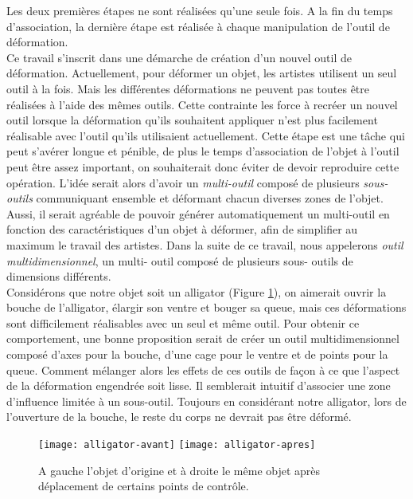 Les deux premières étapes ne sont réalisées qu'une seule fois. A la fin du
temps d'association, la dernière étape est réalisée à chaque manipulation de
l'outil de déformation. \\

Ce travail s'inscrit dans une démarche de création d'un nouvel outil de
déformation. Actuellement, pour déformer un objet, les artistes utilisent un
seul outil à la fois. Mais les différentes déformations ne peuvent pas toutes
être réalisées à l'aide des mêmes outils. Cette contrainte les force à recréer
un nouvel outil lorsque la déformation qu'ils souhaitent appliquer n'est plus
facilement réalisable avec l'outil qu'ils utilisaient actuellement. Cette
étape est une tâche qui peut s'avérer longue et pénible, de plus le temps
d'association de l'objet à l'outil peut être assez important, on souhaiterait
donc éviter de devoir reproduire cette opération. L'idée serait alors d'avoir
un \textit {multi-outil} composé de plusieurs \textit{sous-outils}
communiquant ensemble et déformant chacun diverses zones de l'objet. Aussi, il
serait agréable de pouvoir générer automatiquement un multi-outil en fonction
des caractéristiques d'un objet à déformer, afin de simplifier au maximum le
travail des artistes. Dans la suite de ce travail, nous appelerons
\textit{outil multidimensionnel}, un multi- outil composé de plusieurs sous-
outils de dimensions différents. \\

Considérons que notre objet soit un alligator (Figure \ref{INTall}), on
aimerait ouvrir la bouche de l'alligator, élargir son ventre et bouger sa
queue, mais ces déformations sont difficilement réalisables avec un seul et
même outil. Pour obtenir ce comportement, une bonne proposition serait de
créer un outil multidimensionnel composé d'axes pour la bouche, d'une cage
pour le ventre et de points pour la queue. Comment mélanger alors les effets
de ces outils de façon à ce que l'aspect de la déformation engendrée soit
lisse. Il semblerait intuitif d'associer une zone d'influence limitée à un
sous-outil. Toujours en considérant notre alligator, lors de l'ouverture de la
bouche, le reste du corps ne devrait pas être déformé. \\

\begin{figure}[ht]
  \texttt{[image: alligator-avant]}
  \texttt{[image: alligator-apres]}

  \caption[Explication déformation multi-outil]   {A gauche l'objet d'origine
et à droite le même objet après déplacement de certains points de contrôle.}

  \label{INTall}
\end{figure}


